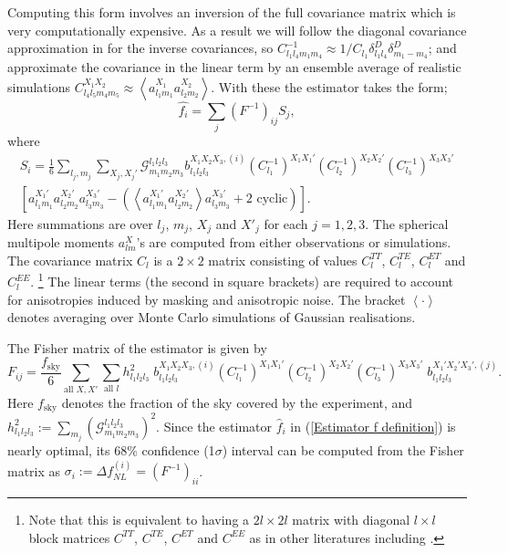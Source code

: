 Computing this form involves an inversion of the full covariance matrix which is very computationally expensive. As a result we will follow the diagonal covariance approximation in \cite{Yadav2007} for the inverse covariances,  so $C_{l_1 l_4 m_1 m_4}^{-1} \approx 1/C_{l_1}  \delta^D_{l_1 l_4} \delta^D_{m_1 -m_4}$; and approximate the covariance in the linear term by an ensemble average of realistic simulations  $C_{l_4 l_5 m_4 m_5}^{X_1 X_2} \approx \left< a_{l_1 m_1}^{X_1} a_{l_2 m_2}^{X_2} \right>$.  With these the estimator takes the form;
\begin{equation}
	\hat{f_i} = \sum_j (F^{-1})_{ij} S_j,
	\label{Estimator f definition}
\end{equation}
where
\begin{eqnarray}
	S_i =  \frac{1}{6} \sum_{l_j, m_j} \sum_{X_j, X_j'} \mathcal{G}_{m_1 m_2 m_3}^{l_1 l_2 l_3} b_{l_1 l_2 l_3} ^{X_1 X_2 X_3, (i)} (C_{l_1}^{-1})^{X_1 X_1'} (C_{l_2}^{-1})^{X_2 X_2'} (C_{l_3}^{-1})^{X_3 X_3'} \nonumber \\  \left[ a_{l_1 m_1}^{X_1'} a_{l_2 m_2}^{X_2'} a_{l_3 m_3}^{X_3'} -  \left( \left< a_{l_1 m_1}^{X_1'} a_{l_2 m_2}^{X_2'} \right> a_{l_3 m_3}^{X_3'} + \text{2 cyclic} \right)   \right].
	\label{Estimator S definition}
\end{eqnarray}
Here summations are over $l_j$, $m_j$, $X_j$ and $X'_j$ for each $j=1,2,3$. The spherical multipole moments $a_{lm}^{X}$'s are computed from either observations or simulations. The covariance matrix $C_l$ is a $2\times2$ matrix consisting of values $C_l^{TT}$, $C_l^{TE}$, $C_l^{ET}$ and $C_l^{EE}$. \footnote{Note that this is equivalent to having a $2l\times2l$ matrix with diagonal $l\times l$ block matrices $C^{TT}$, $C^{TE}$, $C^{ET}$ and $C^{EE}$ as in other literatures including \cite{Fergusson2014}.} The linear terms (the second in square brackets) are required to account for anisotropies induced by masking and anisotropic noise. The bracket $\left< \cdot \right>$ denotes averaging over Monte Carlo simulations of Gaussian realisations.

The Fisher matrix of the estimator is given by
\begin{equation}
	F_{ij}= \frac{f_\text{sky}}{6} \sum_{\text{all }X, X'} \sum_{\text{all }l} h_{l_1 l_2 l_3}^2 \; b_{l_1 l_2 l_3}^{X_1 X_2 X_3, (i)} (C_{l_1}^{-1})^{X_1 X_1'} (C_{l_2}^{-1})^{X_2 X_2'} (C_{l_3}^{-1})^{X_3 X_3'} \; b_{l_1 l_2 l_3}^{X_1' X_2' X_3', (j)}.
	\label{Estimator F definition}
\end{equation}
Here $f_\text{sky}$ denotes the fraction of the sky covered by the experiment, and $h_{l_1 l_2 l_3}^2 := \sum_{m_j} \left( \mathcal{G}_{m_1 m_2 m_3}^{l_1 l_2 l_3} \right) ^2$. Since the estimator $\hat{f}_i$ in (\ref{Estimator f definition}) is nearly optimal, its 68\% confidence (1$\sigma$) interval can be computed from the Fisher matrix as $\sigma_i := \Delta f_{NL}^{(i)} = (F^{-1})_{ii}$.

